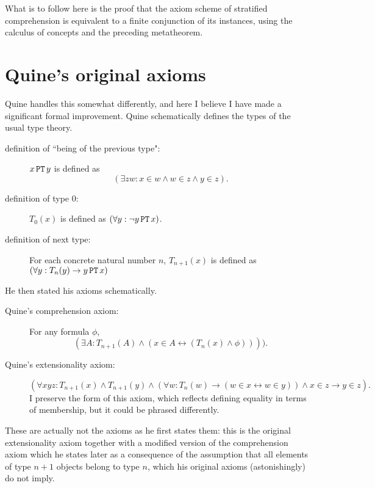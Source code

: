 \documentclass[12pt]{article}
\begin{document}
What is to follow here is the proof that the axiom scheme of stratified comprehension is equivalent to a finite conjunction of its instances, using the calculus of concepts and the preceding metatheorem.





\section{Quine's original axioms}

Quine handles this somewhat differently, and here I believe I have made a significant formal improvement.  Quine schematically defines the types of the usual type theory.


\begin{description}

\item[definition of ``being of the previous type":]  $x\, {\tt PT}\, y$ is defined as $$(\exists zw: x \in w \wedge w \in z \wedge y \in z).$$

\item[definition of type 0:]  $T_0(x)$ is defined as $(\forall y: \neg y\, {\tt PT}\, x)$.

\item[definition of next type:]  For each concrete natural number $n$, $T_{n+1}(x)$ is
defined as $(\forall y:  T_n(y) \rightarrow y\, {\tt PT}\, x)$

\end{description}

He then stated his axioms schematically.


\begin{description}

\item[Quine's comprehension axiom:]  For any formula $\phi$, $$(\exists A:  T_{n+1}(A) \wedge (x\in A \leftrightarrow (T_n(x) \wedge  \phi)))).$$

\item[Quine's extensionality axiom:]  $$(\forall xyz:T_{n+1}(x) \wedge  T_{n+1}(y) \wedge (\forall w:T_n(w) \rightarrow (w \in x \leftrightarrow w \in y)) \wedge x \in z \rightarrow y \in z).$$  I preserve the form of this axiom, which reflects defining equality in terms of membership, but it could be phrased differently.

\end{description}

These are actually not the axioms as he first states them:  this is the original extensionality axiom together with a modified version of the comprehension axiom which he states later as a consequence of the assumption that all elements of type $n+1$ objects belong to type $n$, which his original axioms (astonishingly) do not imply.
\end{document}
